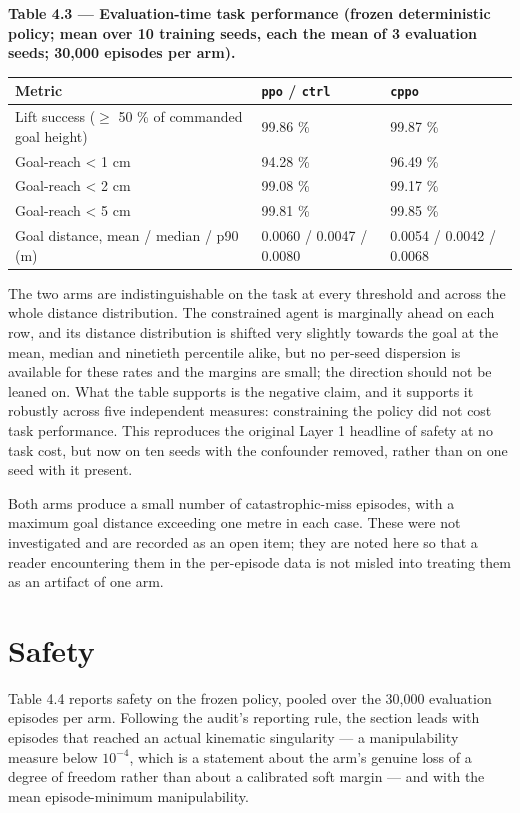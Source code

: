 \textbf{Table 4.3 --- Evaluation-time task performance (frozen deterministic policy; mean over 10 training
seeds, each the mean of 3 evaluation seeds; 30,000 episodes per arm).}

\begin{longtable}[]{@{}lll@{}}
\toprule
Metric & \texttt{ppo} / \texttt{ctrl} & \texttt{cppo}\tabularnewline
\midrule
\endhead
Lift success (\(\ge\) 50 \% of commanded goal height) & 99.86 \% & 99.87 \%\tabularnewline
Goal-reach \textless{} 1 cm & 94.28 \% & 96.49 \%\tabularnewline
Goal-reach \textless{} 2 cm & 99.08 \% & 99.17 \%\tabularnewline
Goal-reach \textless{} 5 cm & 99.81 \% & 99.85 \%\tabularnewline
Goal distance, mean / median / p90 (m) & 0.0060 / 0.0047 / 0.0080 & 0.0054 / 0.0042 / 0.0068\tabularnewline
\bottomrule
\end{longtable}

The two arms are indistinguishable on the task at every threshold and across the whole distance
distribution. The constrained agent is marginally ahead on each row, and its distance distribution
is shifted very slightly towards the goal at the mean, median and ninetieth percentile alike, but
no per-seed dispersion is available for these rates and the margins are small; the direction
should not be leaned on. What the table supports is the negative claim, and it supports it
robustly across five independent measures: constraining the policy did not cost task performance.
This reproduces the original Layer 1 headline of safety at no task cost, but now on ten seeds with
the confounder removed, rather than on one seed with it present.

Both arms produce a small number of catastrophic-miss episodes, with a maximum goal distance
exceeding one metre in each case. These were not investigated and are recorded as an open item;
they are noted here so that a reader encountering them in the per-episode data is not misled into
treating them as an artifact of one arm.


\section{Safety}\label{sec:r-safety}

Table 4.4 reports safety on the frozen policy, pooled over the 30,000 evaluation episodes per arm.
Following the audit's reporting rule, the section leads with episodes that reached an actual
kinematic singularity --- a manipulability measure  below \(10^{-4}\), which is a statement about
the arm's genuine loss of a degree of freedom rather than about a calibrated soft margin --- and with
the mean episode-minimum manipulability.

